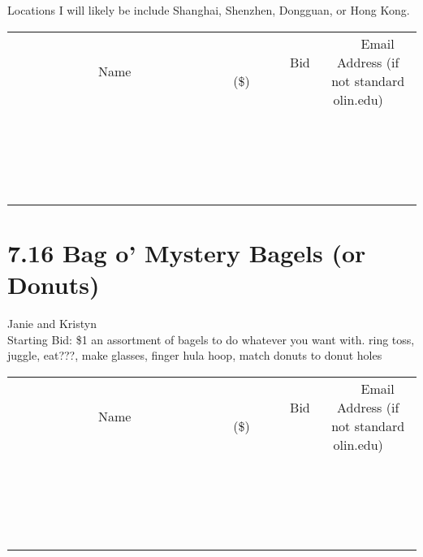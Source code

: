 \documentclass[11pt]{article}
\begin{document}
Locations I will likely be include Shanghai, Shenzhen, Dongguan, or Hong Kong.
\\[3ex]
\begin{tabular}{c c c}
~~~~~~~~~~~~~Name~~~~~~~~~~~~~ & ~~~~~~~~~Bid (\$)~~~~~~~~~  & ~~~Email Address (if not standard olin.edu)~~~\\
 & & \\
\hline
 & & \\
\hline
 & & \\
\hline
 & & \\
\hline
 & & \\
\hline
 & & \\
\hline
 & & \\
\hline
 & & \\
\hline
 & & \\
\hline
 & & \\
\hline
 & & \\
\hline
 & & \\
\hline
 & & \\
\hline
 & & \\
\hline
 & & \\
\hline
 & & \\
\hline
 & & \\
\hline
 & & \\
\hline
 & & \\
\hline
\end{tabular}
\newpage
\section*{7.16 Bag o' Mystery Bagels (or Donuts)}
Janie and Kristyn
\\
Starting Bid: \$1
\newline
an assortment of bagels to do whatever you want with.  ring toss, juggle, eat???, make glasses, finger hula hoop, match donuts to donut holes
\\[3ex]
\begin{tabular}{c c c}
~~~~~~~~~~~~~Name~~~~~~~~~~~~~ & ~~~~~~~~~Bid (\$)~~~~~~~~~  & ~~~Email Address (if not standard olin.edu)~~~\\
 & & \\
\hline
 & & \\
\hline
 & & \\
\hline
 & & \\
\hline
 & & \\
\hline
 & & \\
\hline
 & & \\
\hline
 & & \\
\hline
 & & \\
\hline
 & & \\
\hline
 & & \\
\hline
 & & \\
\hline
 & & \\
\hline
 & & \\
\hline
 & & \\
\hline
 & & \\
\hline
 & & \\
\hline
 & & \\
\hline
 & & \\
\hline
\end{tabular}
\newpage
\end{document}
